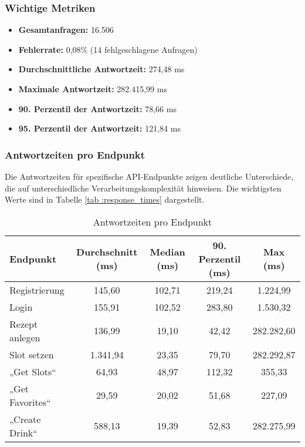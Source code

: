 \subsubsection*{Wichtige Metriken}
\begin{itemize}
    \item \textbf{Gesamtanfragen:} 16.506
    \item \textbf{Fehlerrate:} 0,08\% (14 fehlgeschlagene Anfragen)
    \item \textbf{Durchschnittliche Antwortzeit:} 274,48 ms
    \item \textbf{Maximale Antwortzeit:} 282.415,99 ms
    \item \textbf{90. Perzentil der Antwortzeit:} 78,66 ms
    \item \textbf{95. Perzentil der Antwortzeit:} 121,84 ms
\end{itemize}

\subsubsection*{Antwortzeiten pro Endpunkt}

Die Antwortzeiten für spezifische API-Endpunkte zeigen deutliche Unterschiede, die auf 
unterschiedliche Verarbeitungskomplexität hinweisen. Die wichtigsten Werte sind in Tabelle \ref{tab
:response_times} dargestellt.

\begin{table}[h!]
    \centering
    \begin{tabular}{|l|c|c|c|c|}
        \hline
        \textbf{Endpunkt} & \textbf{Durchschnitt (ms)} & \textbf{Median (ms)} & \textbf{90. Perzentil (ms)} & \textbf{Max (ms)} \\
        \hline
        Registrierung & 145,60 & 102,71 & 219,24 & 1.224,99 \\
        Login & 155,91 & 102,52 & 283,80 & 1.530,32 \\
        Rezept anlegen & 136,99 & 19,10 & 42,42 & 282.282,60 \\
        Slot setzen & 1.341,94 & 23,35 & 79,70 & 282.292,87 \\
        „Get Slots“ & 64,93 & 48,97 & 112,32 & 355,33 \\
        „Get Favorites“ & 29,59 & 20,02 & 51,68 & 227,09 \\
        „Create Drink“ & 588,13 & 19,39 & 52,83 & 282.275,99 \\
        \hline
    \end{tabular}
    \caption{Antwortzeiten pro Endpunkt}
    \label{tab:response_times}
\end{table}

